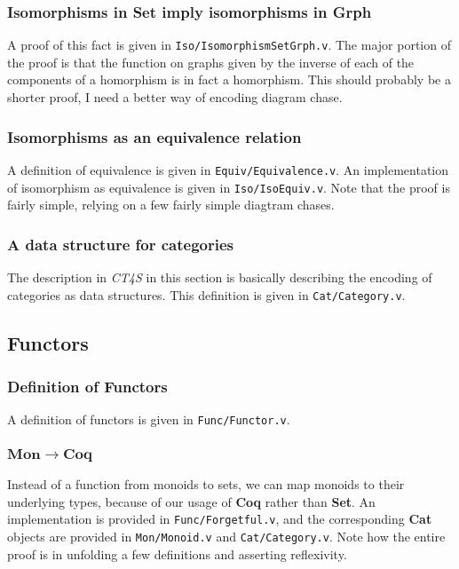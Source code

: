 \documentclass[12pt,twocolumn,oneside]{book}
\begin{document}
\subsubsection{Isomorphisms in \textbf{Set} imply isomorphisms in \textbf{Grph}}

A proof of this fact is given in \texttt{Iso/IsomorphismSetGrph.v}. The major portion of the
proof is that the function on graphs given by the inverse of each of the components
of a homorphism is in fact a homorphism. This should probably be a shorter proof,
I need a better way of encoding diagram chase.

\subsubsection{Isomorphisms as an equivalence relation}

A definition of equivalence is given in \texttt{Equiv/Equivalence.v}. An implementation
of isomorphism as equivalence is given in \texttt{Iso/IsoEquiv.v}. Note that the proof
is fairly simple, relying on a few fairly simple diagtram chases.

\subsubsection{A data structure for categories}

The description in \emph{CT4S} in this section is basically describing the encoding
of categories as data structures. This definition is given in \texttt{Cat/Category.v}.

\subsection{Functors}

\subsubsection{Definition of Functors}

A definition of functors is given in \texttt{Func/Functor.v}.

\subsubsection{$\mathbf{Mon} \to \mathbf{Coq}$}

Instead of a function from monoids to sets, we can map monoids to their underlying types, because
of our usage of \textbf{Coq} rather than \textbf{Set}. An implementation is provided
in \texttt{Func/Forgetful.v}, and the corresponding \textbf{Cat} objects are provided in \texttt{Mon/Monoid.v}
and \texttt{Cat/Category.v}. Note how the entire proof is in unfolding a few definitions and
asserting reflexivity.
\end{document}

